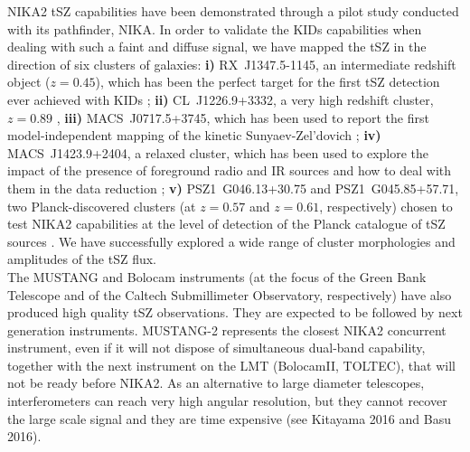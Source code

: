 \documentclass[11pt,a4paper,twoside,graphicx,color]{article}
\begin{document}
NIKA2 tSZ capabilities have been demonstrated through a pilot study
conducted with its pathfinder, NIKA. In order to validate the KIDs capabilities when dealing with
such a faint and diffuse signal, we have mapped the tSZ in the
direction of six clusters of galaxies:
{\bf i)} RX~J1347.5-1145, an intermediate redshift object ($z=0.45$),
which has been the perfect target for the first tSZ detection ever
achieved with KIDs \cite{Adam2014};
{\bf ii)} CL~J1226.9+3332, a very high redshift cluster, $z=0.89$ \cite{Adam2015}, 
{\bf iii)} MACS~J0717.5+3745, which has been used to report the first
model-independent mapping of the kinetic Sunyaev-Zel'dovich
\cite{Adam2016};
{\bf iv)} MACS~J1423.9+2404, a relaxed cluster, which has been used to
explore the impact of the presence of foreground radio and IR sources
and how to deal with them in the data reduction \cite{Adam2016a};
{\bf v)} PSZ1~G046.13+30.75 and PSZ1~G045.85+57.71, two
Planck-discovered clusters (at $z=0.57$ and $z=0.61$, respectively) chosen
to test NIKA2 capabilities at the level of detection of the Planck
catalogue of tSZ sources \cite{Ruppin2016}.
We have   successfully explored a wide range of cluster morphologies and amplitudes of the tSZ flux. \\
The MUSTANG and Bolocam instruments (at the focus of the
Green Bank Telescope and of the Caltech Submillimeter Observatory,
respectively) have also produced high quality tSZ
observations. They are expected to be followed by next generation
instruments. MUSTANG-2 represents the closest
NIKA2 concurrent instrument, even if it will not dispose of simultaneous dual-band capability, together with 
the next instrument on the LMT (BolocamII, TOLTEC), that will not be ready before NIKA2. As an alternative to large diameter telescopes,
interferometers can reach very high angular resolution, but they
cannot recover the large scale signal and they are time expensive (see Kitayama 2016 and Basu 2016).\\
\end{document}
